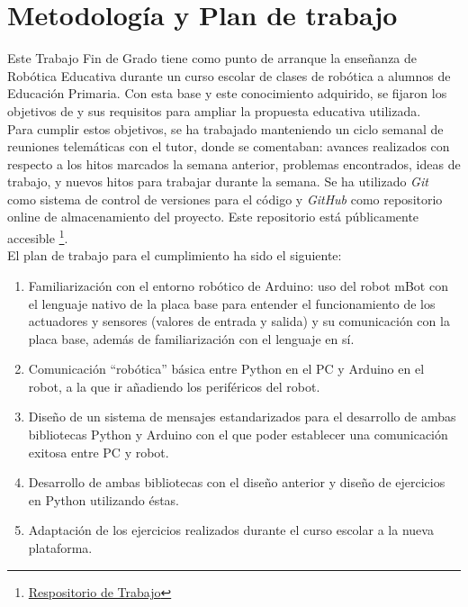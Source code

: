 \section{Metodología y Plan de trabajo}\label{sec:metologia}
Este Trabajo Fin de Grado tiene como punto de arranque la enseñanza de Robótica Educativa durante un curso escolar de clases de robótica a alumnos de Educación Primaria. Con esta base y este conocimiento adquirido, se fijaron los objetivos de y sus requisitos para ampliar la propuesta educativa utilizada.\\
Para cumplir estos objetivos, se ha trabajado manteniendo un ciclo semanal de reuniones telemáticas con el tutor, donde se comentaban: avances realizados con respecto a los hitos marcados la semana anterior, problemas encontrados, ideas de trabajo, y nuevos hitos para trabajar durante la semana. Se ha utilizado \textit{Git} como sistema de control de versiones para el código y \textit{GitHub} como repositorio online de almacenamiento del proyecto. Este repositorio está públicamente accesible \footnote{\href{https://github.com/RoboticsLabURJC/2017-tfg-eva_garcia}{Respositorio de Trabajo}}.\\
El plan de trabajo para el cumplimiento ha sido el siguiente:
\begin{enumerate}
	\item Familiarización con el entorno robótico de Arduino: uso del robot mBot con el lenguaje nativo de la placa base para entender el funcionamiento de los actuadores y sensores (valores de entrada y salida) y su comunicación con la placa base, además de familiarización con el lenguaje en sí. 
	\item Comunicación ``robótica'' básica entre Python en el PC y Arduino en el robot, a la que ir añadiendo los periféricos del robot.
	\item Diseño de un sistema de mensajes estandarizados para el desarrollo de ambas bibliotecas Python y Arduino con el que poder establecer una comunicación exitosa entre PC y robot.
	\item Desarrollo de ambas bibliotecas con el diseño anterior y diseño de ejercicios en Python utilizando éstas.
	\item Adaptación de los ejercicios realizados durante el curso escolar a la nueva plataforma.
\end{enumerate}